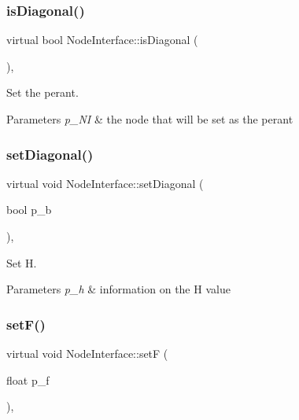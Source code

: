 \subsubsection{\texorpdfstring{is\+Diagonal()}{isDiagonal()}}
{\footnotesize\ttfamily virtual bool Node\+Interface\+::is\+Diagonal (\begin{DoxyParamCaption}{ }\end{DoxyParamCaption})\hspace{0.3cm}{\ttfamily [inline]}, {\ttfamily [virtual]}}



Set the perant. 


\begin{DoxyParams}{Parameters}
{\em p\+\_\+\+NI} & the node that will be set as the perant \\
\hline
\end{DoxyParams}
\mbox{\label{class_node_interface_a759b060003767c5319c1c568705696e0}} 
\subsubsection{\texorpdfstring{set\+Diagonal()}{setDiagonal()}}
{\footnotesize\ttfamily virtual void Node\+Interface\+::set\+Diagonal (\begin{DoxyParamCaption}\item[{bool}]{p\+\_\+b }\end{DoxyParamCaption})\hspace{0.3cm}{\ttfamily [inline]}, {\ttfamily [virtual]}}



Set H. 


\begin{DoxyParams}{Parameters}
{\em p\+\_\+h} & information on the H value \\
\hline
\end{DoxyParams}
\mbox{\label{class_node_interface_a8750e3c16815db5f6bae6de6b3335a8f}} 
\subsubsection{\texorpdfstring{set\+F()}{setF()}}
{\footnotesize\ttfamily virtual void Node\+Interface\+::setF (\begin{DoxyParamCaption}\item[{float}]{p\+\_\+f }\end{DoxyParamCaption})\hspace{0.3cm}{\ttfamily [inline]}, {\ttfamily [virtual]}}



